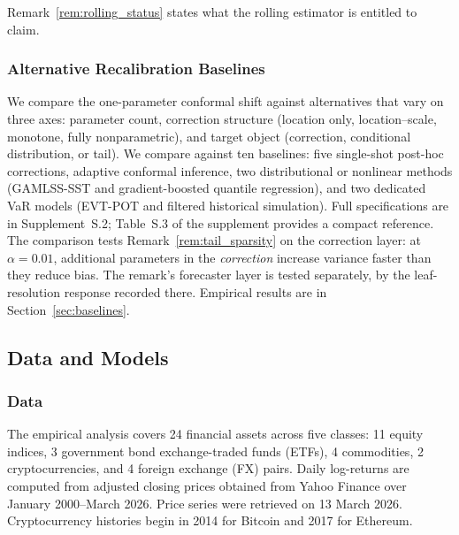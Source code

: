 \documentclass[preprint,11pt,authoryear]{elsarticle}
\newcommand{\1}{\boldsymbol{1}}
\begin{document}
Remark~\ref{rem:rolling_status} states what the rolling estimator is entitled to claim.

\subsubsection{Alternative Recalibration Baselines}
\label{sec:alternatives}

We compare the one-parameter conformal shift against alternatives that vary on three axes: parameter count, correction structure (location only, location--scale, monotone, fully nonparametric), and target object (correction, conditional distribution, or tail). We compare against ten baselines: five single-shot post-hoc corrections, adaptive conformal inference, two distributional or nonlinear methods (GAMLSS-SST and gradient-boosted quantile regression), and two dedicated VaR models (EVT-POT and filtered historical simulation). Full specifications are in Supplement~S.2; Table~S.3 of the supplement provides a compact reference. The comparison tests Remark~\ref{rem:tail_sparsity} on the correction layer: at $\alpha = 0.01$, additional parameters in the \emph{correction} increase variance faster than they reduce bias. The remark's forecaster layer is tested separately, by the leaf-resolution response recorded there. Empirical results are in Section~\ref{sec:baselines}.
\subsection{Data and Models}
\label{sec:data_models}

\subsubsection{Data}
\label{sec:data}

The empirical analysis covers 24 financial assets across five classes: 11 equity indices, 3 government bond exchange-traded funds (ETFs), 4 commodities, 2 cryptocurrencies, and 4 foreign exchange (FX) pairs. Daily log-returns are computed from adjusted closing prices obtained from Yahoo Finance over January 2000--March 2026. Price series were retrieved on 13 March 2026. Cryptocurrency histories begin in 2014 for Bitcoin and 2017 for Ethereum.
\end{document}
